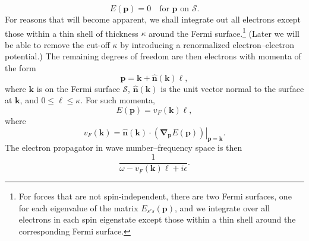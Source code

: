 \begin{equation}
E(\mathbf p)=0\quad\text{for $\mathbf p$ on $\mathcal S$.}
\tag{21.6.38}\label{eq:21.6.38}
\end{equation}
For reasons that will become apparent, we shall integrate out all electrons except those within a thin shell of thickness $\kappa$ around the Fermi surface.\footnote{For forces that are not spin-independent, there are two Fermi surfaces, one for each eigenvalue of the matrix $E_{s's}(\mathbf p)$, and we integrate over all electrons in each spin eigenstate except those within a thin shell around the corresponding Fermi surface.} (Later we will be able to remove the cut-off $\kappa$ by introducing a renormalized electron--electron potential.) The remaining degrees of freedom are then electrons with momenta of the form
\begin{equation}
\mathbf p=\mathbf k+\widehat{\mathbf n}(\mathbf k)\ell,
\tag{21.6.39}\label{eq:21.6.39}
\end{equation}
where $\mathbf k$ is on the Fermi surface $\mathcal S$, $\widehat{\mathbf n}(\mathbf k)$ is the unit vector normal to the surface at $\mathbf k$, and $0\le\ell\le\kappa$. For such momenta,
\begin{equation}
E(\mathbf p)=v_F(\mathbf k)\ell,
\tag{21.6.40}\label{eq:21.6.40}
\end{equation}
where
\begin{equation}
v_F(\mathbf k)=
\left.
\widehat{\mathbf n}(\mathbf k)\cdot
\left(\boldsymbol\nabla_{\mathbf p}E(\mathbf p)\right)
\right|_{\mathbf p=\mathbf k}.
\tag{21.6.41}\label{eq:21.6.41}
\end{equation}
The electron propagator in wave number--frequency space is then
\begin{equation}
\frac{1}{\omega-v_F(\mathbf k)\ell+i\epsilon}.
\tag{21.6.42}\label{eq:21.6.42}
\end{equation}

